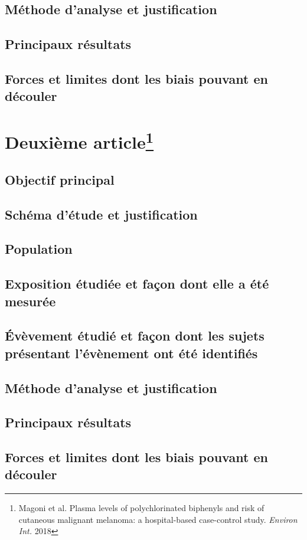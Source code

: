 \documentclass[10pt]{article}
\begin{document}
\subsection{Méthode d'analyse et justification}

\subsection{Principaux résultats}

\subsection{Forces et limites dont les biais pouvant en découler}

\newpage
\section{Deuxième article\protect\footnote{Magoni et al. Plasma levels of polychlorinated biphenyls and risk of cutaneous malignant melanoma: a hospital-based case-control study. \emph{Environ Int.} 2018}}
\subsection{Objectif principal}

\subsection{Schéma d'étude et justification}

\subsection{Population}

\subsection{Exposition étudiée et façon dont elle a été mesurée}

\subsection{\'{E}vèvement étudié et façon dont les sujets présentant l'évènement ont été identifiés}

\subsection{Méthode d'analyse et justification}

\subsection{Principaux résultats}

\subsection{Forces et limites dont les biais pouvant en découler}
\end{document}

